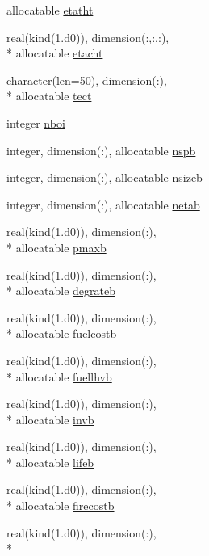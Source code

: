 \begin{DoxyCompactItemize}
allocatable \hyperlink{classinputvar_a258e931040b177ac64cb68a595378fe0}{etatht}
\item 
real(kind(1.d0)), dimension(\-:,\-:,\-:), \\*
allocatable \hyperlink{classinputvar_aacd2eb8dce4dc295c06a7cab54423174}{etacht}
\item 
character(len=50), dimension(\-:), \\*
allocatable \hyperlink{classinputvar_afb7d5163d753c7bbd2c1505e8ee68197}{tect}
\item 
integer \hyperlink{classinputvar_a168bc1dcb73e68b3620991b6494f3797}{nboi}
\item 
integer, dimension(\-:), allocatable \hyperlink{classinputvar_aa1e78ecd4b3cbb3f08b770cf604a5d3d}{nspb}
\item 
integer, dimension(\-:), allocatable \hyperlink{classinputvar_ad0bd77a901e4e300f887dc0682a4884d}{nsizeb}
\item 
integer, dimension(\-:), allocatable \hyperlink{classinputvar_af109996c7b379bac5d6c3d89c5b6df1d}{netab}
\item 
real(kind(1.d0)), dimension(\-:), \\*
allocatable \hyperlink{classinputvar_abe0141eabac694fc809b9b8f8bff28e7}{pmaxb}
\item 
real(kind(1.d0)), dimension(\-:), \\*
allocatable \hyperlink{classinputvar_a62a3dfedaea148a2ae030b1f142663d9}{degrateb}
\item 
real(kind(1.d0)), dimension(\-:), \\*
allocatable \hyperlink{classinputvar_a613d5defd6204729146a9d70f3b81dbe}{fuelcostb}
\item 
real(kind(1.d0)), dimension(\-:), \\*
allocatable \hyperlink{classinputvar_a433ed9c0483e649c0c6e1be84bc9ece2}{fuellhvb}
\item 
real(kind(1.d0)), dimension(\-:), \\*
allocatable \hyperlink{classinputvar_a9720dc92330c2ac44a2ade71319efdfc}{invb}
\item 
real(kind(1.d0)), dimension(\-:), \\*
allocatable \hyperlink{classinputvar_abb62812e265fa305f173457cd4679829}{lifeb}
\item 
real(kind(1.d0)), dimension(\-:), \\*
allocatable \hyperlink{classinputvar_a65f37e4fd6eb186d124bc4c8b2c26f4d}{firecostb}
\item 
real(kind(1.d0)), dimension(\-:), \\*

\end{DoxyCompactItemize}

